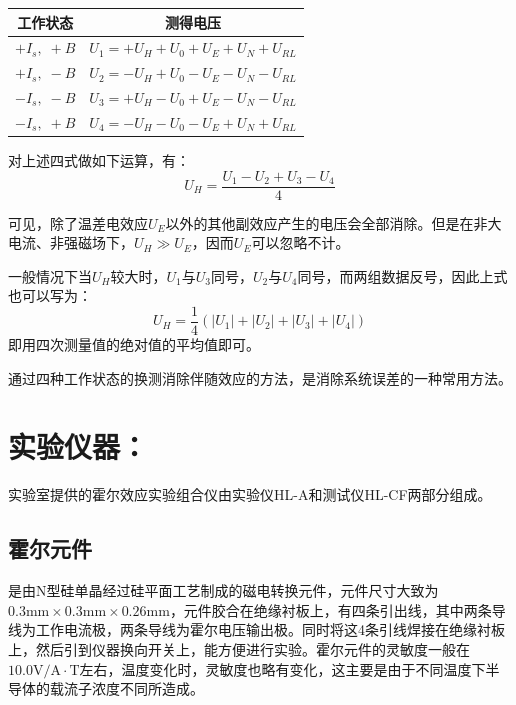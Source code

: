 \begin{center}
\begin{tabular}{c|c}
\hline
\textbf{工作状态} & \textbf{测得电压} \\
\hline
$+I_s,\;+B$ & $U_1 = +U_H + U_0 + U_E + U_N + U_{RL}$ \\
$+I_s,\;-B$ & $U_2 = -U_H + U_0 - U_E - U_N - U_{RL}$ \\
$-I_s,\;-B$ & $U_3 = +U_H - U_0 + U_E - U_N - U_{RL}$ \\
$-I_s,\;+B$ & $U_4 = -U_H - U_0 - U_E + U_N + U_{RL}$ \\
\hline
\end{tabular}
\end{center}

对上述四式做如下运算，有：
\begin{equation}
    U_H = \frac{U_1 - U_2 + U_3 - U_4}{4} \label{eq:5-6}
\end{equation}

可见，除了温差电效应$U_E$以外的其他副效应产生的电压会全部消除。但是在非大电流、非强磁场下，$U_H \gg U_E$，因而$U_E$可以忽略不计。

一般情况下当$U_H$较大时，$U_1$与$U_3$同号，$U_2$与$U_4$同号，而两组数据反号，因此上式也可以写为：
\begin{equation}
    U_H = \frac{1}{4}\left(|U_1| + |U_2| + |U_3| + |U_4|\right) \label{eq:5-7}
\end{equation}
即用四次测量值的绝对值的平均值即可。

通过四种工作状态的换测消除伴随效应的方法，是消除系统误差的一种常用方法。

\section{实验仪器：}

实验室提供的霍尔效应实验组合仪由实验仪HL-A和测试仪HL-CF两部分组成。

\subsection{霍尔元件}

是由N型硅单晶经过硅平面工艺制成的磁电转换元件，元件尺寸大致为$0.3\mathrm{mm} \times 0.3\mathrm{mm} \times 0.26\mathrm{mm}$，元件胶合在绝缘衬板上，有四条引出线，其中两条导线为工作电流极，两条导线为霍尔电压输出极。同时将这4条引线焊接在绝缘衬板上，然后引到仪器换向开关上，能方便进行实验。霍尔元件的灵敏度一般在$10.0\mathrm{V/A}\cdot\mathrm{T}$左右，温度变化时，灵敏度也略有变化，这主要是由于不同温度下半导体的载流子浓度不同所造成。

